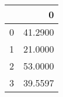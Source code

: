 \begin{tabular}{lr}
\toprule
{} &        0 \\
\midrule
0 &  41.2900 \\
1 &  21.0000 \\
2 &  53.0000 \\
3 &  39.5597 \\
\bottomrule
\end{tabular}
